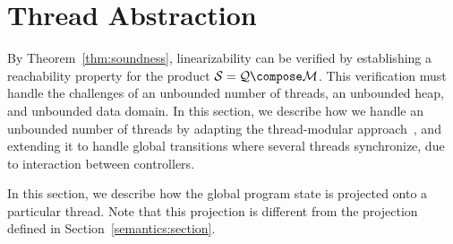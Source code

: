 \section{Thread Abstraction}
\label{thabstraction:section}
By Theorem~\ref{thm:soundness}, linearizability can be verified by
establishing a 
reachability property for the product $\system=\augprog\compose\monitor$.
This verification must handle the challenges of
an unbounded number of threads, an unbounded heap, and unbounded data domain.
In this section, we describe
how we handle an unbounded number of threads by adapting
the thread-modular approach~\cite{BLMRS:cav08}, and extending it to
handle global transitions where several threads synchronize,
due to interaction between controllers. 

In this section, we describe how the global program state is projected onto
a particular thread. Note that this projection is different from the
projection defined in Section~\ref{semantics:section}.


